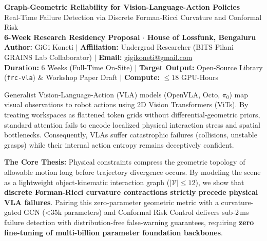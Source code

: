 \documentclass[10pt,a4paper]{article}
\begin{document}
\begin{center}
    {\LARGE\bfseries\color{primary} Graph-Geometric Reliability for Vision-Language-Action Policies}\\[0.3em]
    {\large\color{accent} Real-Time Failure Detection via Discrete Forman-Ricci Curvature and Conformal Risk}\\[0.5em]
    {\normalsize\textbf{6-Week Research Residency Proposal $\cdot$ House of Lossfunk, Bengaluru}}\\[0.6em]
    \normalsize
    \textbf{Author:} GiGi Koneti \quad$\vert$\quad 
    \textbf{Affiliation:} Undergrad Researcher (BITS Pilani GRAINS Lab Collaborator) \quad$\vert$\quad
    \textbf{Email:} \href{mailto:gigikoneti@gmail.com}{gigikoneti@gmail.com}\\
    \small
    \textbf{Duration:} 6 Weeks (Full-Time On-Site) \quad$\vert$\quad 
    \textbf{Target Output:} Open-Source Library (\texttt{frc-vla}) \& Workshop Paper Draft \quad$\vert$\quad 
    \textbf{Compute:} $\le 18$ GPU-Hours
\end{center}

\vspace{-0.5em}

\begin{summarybox}
Generalist Vision-Language-Action (VLA) models (OpenVLA, Octo, $\pi_0$) map visual observations to robot actions using 2D Vision Transformers (ViTs). By treating workspaces as flattened token grids without differential-geometric priors, standard attention fails to encode localized physical interaction stress and spatial bottlenecks. Consequently, VLAs suffer catastrophic failures (collisions, unstable grasps) while their internal action entropy remains deceptively confident.

\smallskip
\textbf{The Core Thesis:} Physical constraints compress the geometric topology of allowable motion long before trajectory divergence occurs. By modeling the scene as a lightweight object-kinematic interaction graph ($|\mathcal{V}| \le 12$), we show that \textbf{discrete Forman-Ricci curvature contractions strictly precede physical VLA failures}. Pairing this zero-parameter geometric metric with a curvature-gated GCN (<35k parameters) and Conformal Risk Control delivers sub-2\,ms failure detection with distribution-free false-warning guarantees, requiring \textbf{zero fine-tuning of multi-billion parameter foundation backbones}.
\end{summarybox}
\end{document}
